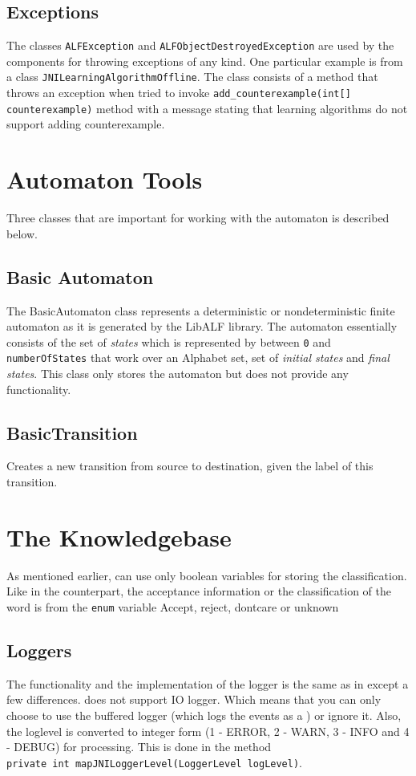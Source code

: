 \subsection*{Exceptions}
The classes \texttt{ALFException} and \texttt{ALFObjectDestroyedException} are used by the components for throwing exceptions of any kind. One particular example is from a class \texttt{JNILearningAlgorithmOffline}. The class consists of a method that throws an exception when tried to invoke \texttt{add\_counterexample(int[] counterexample)} method with a message stating that \offline learning algorithms do not support adding counterexample.



\section{Automaton Tools}
Three classes that are important for working with the automaton is described below.

\subsection*{Basic Automaton}
The BasicAutomaton class represents a deterministic or nondeterministic finite automaton as it is generated by the LibALF library.
The automaton essentially consists of the set of \emph{states} which is represented by \integer between \texttt{0} and \texttt{numberOfStates} that work over an Alphabet set, set of \emph{initial states} and \emph{final states}. This class only stores the automaton but does not provide any functionality. 

\subsection*{BasicTransition}
Creates a new transition from source to destination, given the label of this transition.

\section{The Knowledgebase}
As mentioned earlier, \jalf can use only boolean variables for storing the classification. 
Like in the \cpp counterpart, the acceptance information or the classification of the word is from the \texttt{enum} variable {Accept, reject, dontcare or unknown}

\subsection{Loggers}
The functionality and the implementation of the logger is the same as in \libalf except a few differences. \jalf does not support IO logger. Which means that you can only choose to use the buffered logger (which logs the events as a \stringtype) or ignore it.
Also, the loglevel is converted to integer form (1 - ERROR, 2 - WARN, 3 - INFO and 4 - DEBUG) for processing. This is done in the method \\ \texttt{private int mapJNILoggerLevel(LoggerLevel logLevel)}. 

